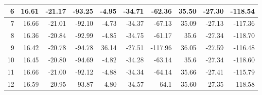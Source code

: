 \begin{table}[]
{\begin{tabular}{|r|r|r|r|r|r|r|r|r|r|}
6                             & 16.61                       & -21.17                      & -93.25                                 & -4.95                       & -34.71                      & -62.36                                 & 35.50                        & -27.30                       & -118.54                                \\ \hline
7                             & 16.66                       & -21.01                      & -92.10                                  & -4.73                       & -34.37                      & -67.13                                 & 35.09                       & -27.13                      & -117.36                                \\ \hline
8                             & 16.36                       & -20.84                      & -92.99                                 & -4.85                       & -34.75                      & -61.17                                 & 35.6                        & -27.34                      & -118.70                                 \\ \hline
9                             & 16.42                       & -20.78                      & -94.78                                 & 36.14                       & -27.51                      & -117.96                                & 36.05                       & -27.59                      & -116.48                                \\ \hline
10                            & 16.45                       & -20.80                       & -94.69                                 & -4.82                       & -34.28                      & -63.14                                 & 35.6                        & -27.34                      & -118.60                                 \\ \hline
11                            & 16.66                       & -21.00                         & -92.12                                 & -4.88                       & -34.34                      & -64.14                                 & 35.66                       & -27.41                      & -115.79                                \\ \hline
12                            & 16.59                       & -20.95                      & -93.87                                 & -4.80                        & -34.57                      & -64.1                                  & 35.60                        & -27.35                      & -118.58                                \\ \hline

\end{tabular}}
\end{table}
